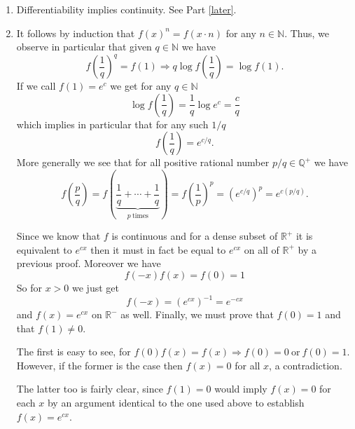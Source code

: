 \documentclass[12pt]{article}
\begin{document}
\begin{enumerate}
\item Differentiability implies continuity. See Part \ref{later}.

\item \label{later} It follows by induction that $f(x)^n = f(x \cdot n) $ for any $n \in \mathbb{N}$. Thus, we observe in particular that given $q \in \mathbb{N}$ we have
\[f\left(\frac{1}{q} \right)^q = f(1) \Rightarrow q\log{f\left(\frac{1}{q}\right)} = \log{f(1)}.\]
If we call $f(1)=e^c$ we get for any $q \in \mathbb{N}$
\[ \log{f\left( \frac{1}{q} \right)  } = \frac{1}{q} \log{e^{c}} = \frac{c}{q} \]
which implies in particular that for any such $1/q$
\[f\left( \frac{1}{q} \right) = e^{c/q}.\]
More generally we see that for all positive rational number $p/q \in \mathbb{Q^+}$ we have 
\[f\left( \frac{p}{q} \right) = f\left( \underbrace{\frac{1}{q}+\cdots+\frac{1}{q}}_{p\mathrm{\ times}} \right)= f\left( \frac{1}{p} \right)^p = \left( e^{c/q}\right)^p =e^{c(p/q)}.\]

Since we know that $f$ is continuous and for a dense subset of $\mathbb{R}^+$ it is equivalent to $e^{c x}$ then it must in fact be equal to $e^{cx}$ on all of $\mathbb{R}^+$ by a previous proof. Moreover we have 
\[ f(-x)f(x) = f(0) = 1 \]
So for $x>0$ we just get
\[f(-x) = \left( e^{cx}\right)^{-1}= e^{-cx}\]
and $f(x)=e^{cx}$ on $\mathbb{R}^- $ as well. Finally, we must prove that $f(0)=1$ and that $f(1)\neq 0$.

The first is easy to see, for $f(0)f(x)= f(x) \Rightarrow f(0)= 0 \mathrm{\ or\ } f(0)=1$. However, if the former is the case then $f(x)=0$ for all $x$, a contradiction.

The latter too is fairly clear, since $f(1)=0$ would imply $f(x)=0$ for each $x$ by an argument identical to the one used above to establish $f(x)= e^{c x}$.

\end{enumerate}
\end{document}
